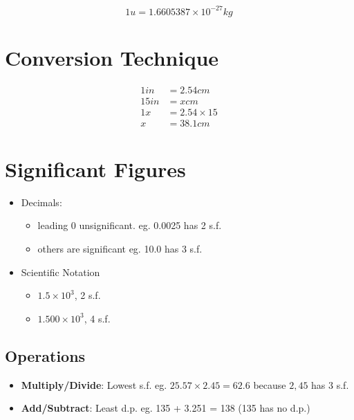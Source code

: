 \documentclass[12pt]{article}
\begin{document}
\begin{spacing}{1.5}
$$1u = 1.6605387 \times 10^{-27} kg$$

\section{Conversion Technique}

$$\begin{aligned}
1 in &= 2.54 cm \\
15 in &= x cm \\
1x &= 2.54 \times 15 \\
x &= 38.1 cm
\end{aligned}$$

\section{Significant Figures}

\begin{itemize}
	\item Decimals: 
		\begin{itemize}
			\item leading 0 unsignificant. eg. 0.0025 has 2 s.f.
			\item others are significant eg. 10.0 has 3 s.f.
		\end{itemize}
	\item Scientific Notation
		\begin{itemize}
			\item $1.5 \times 10^{3}$, 2 s.f.
			\item $1.500 \times 10^{3}$, 4 s.f.
		\end{itemize}
\end{itemize}

\subsection{Operations}

\begin{itemize}
	\item \textbf{Multiply/Divide}: Lowest s.f. eg. $25.57 \times 2.45 = 62.6$ because $2,45$ has 3 s.f.
	\item \textbf{Add/Subtract}: Least d.p. eg. 135 + 3.251 = 138 (135 has no d.p.)
\end{itemize}

\end{spacing}
\end{document}
